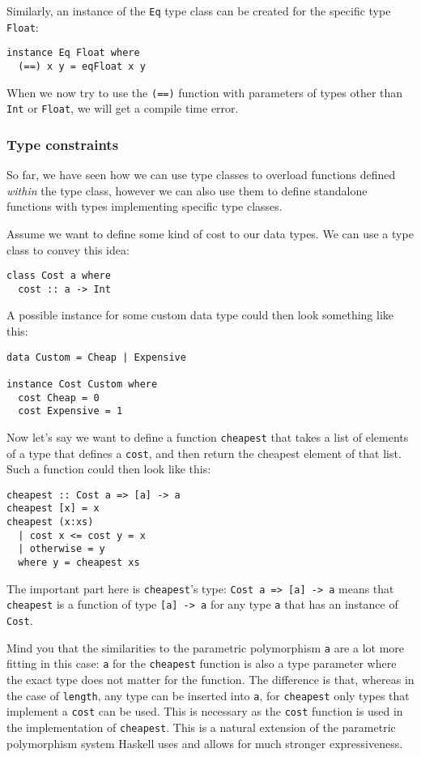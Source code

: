 Similarly, an instance of the \verb|Eq| type class can be created for the specific type \verb|Float|:
\begin{verbatim}
instance Eq Float where
  (==) x y = eqFloat x y
\end{verbatim}

When we now try to use the \verb|(==)| function with parameters of types other than \verb|Int| or \verb|Float|, we will get a compile time error.

\subsubsection{Type constraints}\label{constraints}

So far, we have seen how we can use type classes to overload functions defined \textit{within} the type class, however we can also use them to define standalone functions with types implementing specific type classes.

Assume we want to define some kind of cost to our data types. We can use a type class to convey this idea:
\begin{verbatim}
class Cost a where
  cost :: a -> Int
\end{verbatim}
A possible instance for some custom data type could then look something like this:
\begin{verbatim}
data Custom = Cheap | Expensive

instance Cost Custom where
  cost Cheap = 0
  cost Expensive = 1
\end{verbatim}

Now let's say we want to define a function \verb|cheapest| that takes a list of elements of a type that defines a \verb|cost|, and then return the cheapest element of that list. Such a function could then look like this:
\begin{verbatim}
cheapest :: Cost a => [a] -> a
cheapest [x] = x
cheapest (x:xs)
  | cost x <= cost y = x
  | otherwise = y
  where y = cheapest xs
\end{verbatim}
The important part here is \verb|cheapest|'s type: \verb|Cost a => [a] -> a| means that \verb|cheapest| is a function of type \verb|[a] -> a| for any type \verb|a| that has an instance of \verb|Cost|.

Mind you that the similarities to the parametric polymorphism \verb|a| are a lot more fitting in this case: \verb|a| for the \verb|cheapest| function is also a type parameter where the exact type does not matter for the function. The difference is that, whereas in the case of \verb|length|, any type can be inserted into \verb|a|, for \verb|cheapest| only types that implement a \verb|cost| can be used. This is necessary as the \verb|cost| function is used in the implementation of \verb|cheapest|. This is a natural extension of the parametric polymorphism system Haskell uses and allows for much stronger expressiveness.

